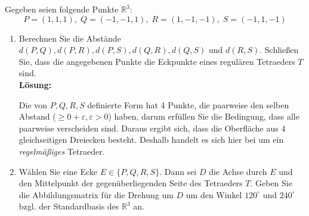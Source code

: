 \documentclass[11pt,a4paper,ngerman]{article}
\newcommand{\R}{\mathbb{R}}
\begin{document}
Gegeben seien folgende Punkte $\mathbb{R}^3:$
$$
P=(1,1,1),\; Q=(-1,-1,1),\; R=(1,-1,-1),\; S=(-1,1,-1)
$$
\begin{enumerate}[\bfseries (a)]

\item Berechnen Sie die Abstände $d(P,Q), d(P,R), d(P,S), d(Q,R), d(Q,S)$ und $d(R,S)$. Schließen Sie, dass die angegebenen Punkte die Eckpunkte eines regulären Tetraeders $T$ sind.\\

\textbf{Lösung:}


Die von $P,Q,R,S$ definierte Form hat 4 Punkte, die paarweise den selben Abstand ($\geq 0+ \varepsilon, \varepsilon > 0$) haben, darum erfüllen Sie die Bedingung, dass alle paarweise verscheiden sind. Daraus ergibt sich, dass die Oberfläche aus 4 gleichseitigen Dreiecken besteht. Deshalb handelt es sich hier bei um ein \emph{regelmäßiges} Tetraeder.


\item Wählen Sie eine Ecke $E \in \{  P,Q,R,S\} $. Dann sei $D$ die Achse durch $E$ und den Mittelpunkt der gegenüberliegenden Seite des Tetraeders $T$. Geben Sie die Abbildungsmatrix für die Drehung um $D$ um den Winkel $120^\circ$ und $240^\circ$ bzgl. der Standardbasis des $\R ^3$ an.\\


\end{enumerate}
\end{document}

